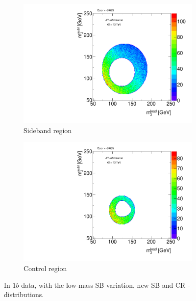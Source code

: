 \begin{figure}[htbp!]
\centering
\captionsetup{justification=centering}
    \begin{subfigure}[b]{0.39\textwidth}
        \includegraphics[width=\textwidth,angle=-90]{figures/boosted/Syst_CRSB/SB_Low_Sideband_OneTag_mH0H1.pdf}
        \caption{Sideband region}
        \label{CRSB:SB_Low_SB}
    \end{subfigure}
    \quad
    \begin{subfigure}[b]{0.39\textwidth}
        \includegraphics[width=\textwidth,angle=-90]{figures/boosted/Syst_CRSB/SB_Low_Control_OneTag_mH0H1.pdf}
        \caption{Control region}
        \label{CRSB:SB_Low_CR}
    \end{subfigure}
\caption{In $1b$ data, with the low-mass SB variation, new SB and CR \mleadJ-\msublJ~ distributions.}
\label{CRSB:SB_Low}
\end{figure}


